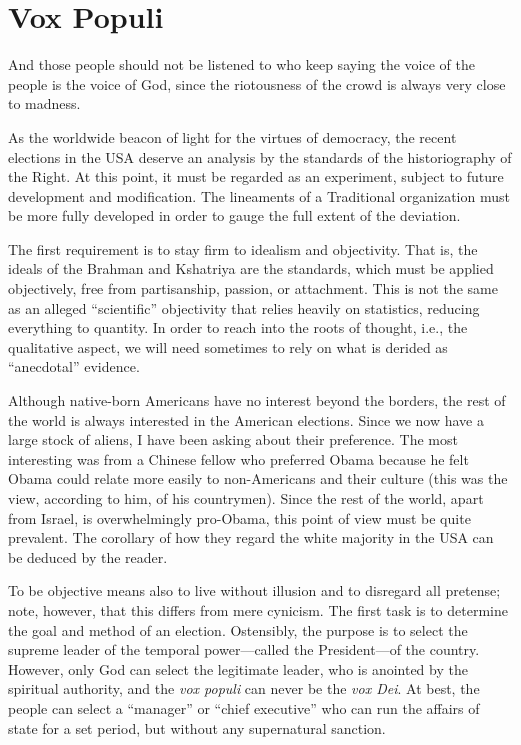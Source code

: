 \section{Vox Populi}

\begin{quotex}
And those people should not be listened to who keep saying the voice of the people is the voice of God, since the riotousness of the crowd is always very close to madness.
\end{quotex}


As the worldwide beacon of light for the virtues of democracy, the recent elections in the USA deserve an analysis by the standards of the historiography of the Right. At this point, it must be regarded as an experiment, subject to future development and modification. The lineaments of a Traditional organization must be more fully developed in order to gauge the full extent of the deviation.

The first requirement is to stay firm to idealism and objectivity. That is, the ideals of the Brahman and Kshatriya are the standards, which must be applied objectively, free from partisanship, passion, or attachment. This is not the same as an alleged ``scientific'' objectivity that relies heavily on statistics, reducing everything to quantity. In order to reach into the roots of thought, i.e., the qualitative aspect, we will need sometimes to rely on what is derided as ``anecdotal'' evidence.

Although native-born Americans have no interest beyond the borders, the rest of the world is always interested in the American elections. Since we now have a large stock of aliens, I have been asking about their preference. The most interesting was from a Chinese fellow who preferred Obama because he felt Obama could relate more easily to non-Americans and their culture (this was the view, according to him, of his countrymen). Since the rest of the world, apart from Israel, is overwhelmingly pro-Obama, this point of view must be quite prevalent. The corollary of how they regard the white majority in the USA can be deduced by the reader.

To be objective means also to live without illusion and to disregard all pretense; note, however, that this differs from mere cynicism. The first task is to determine the goal and method of an election. Ostensibly, the purpose is to select the supreme leader of the temporal power---called the President---of the country. However, only God can select the legitimate leader, who is anointed by the spiritual authority, and the \emph{vox populi} can never be the \emph{vox Dei}. At best, the people can select a ``manager'' or ``chief executive'' who can run the affairs of state for a set period, but without any supernatural sanction.

